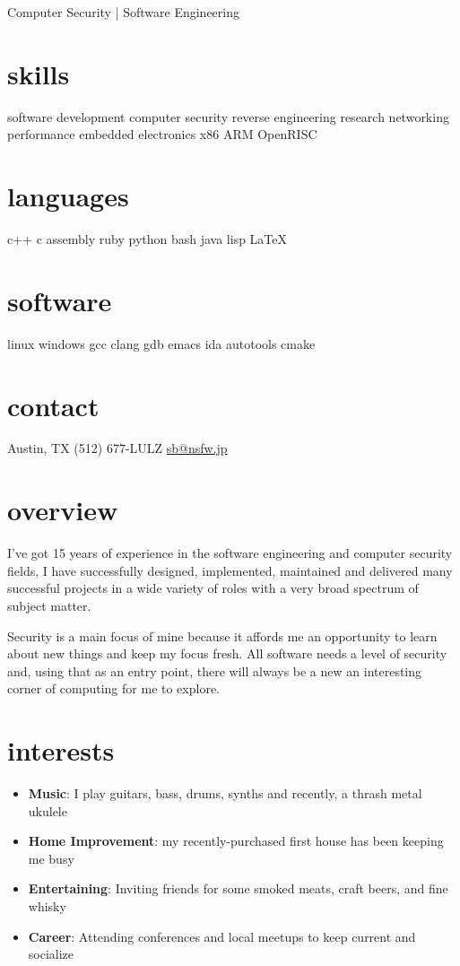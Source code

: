 \documentclass[]{friggeri-cv}
\begin{document}
       {Computer Security | Software Engineering}

\begin{aside}
  \section{skills}
  software development
  computer security
  reverse engineering
  research
  networking
  performance
  embedded
  electronics
  x86
  ARM
  OpenRISC
  \section{languages}
  c++
  c
  assembly
  ruby
  python
  bash
  java
  lisp
  \LaTeX
  \section{software}
  linux
  windows
  gcc
  clang
  gdb
  emacs
  ida
  autotools
  cmake
  \section{contact}
  Austin, TX
  (512) 677-LULZ
  \href{mailto:sb@nsfw.jp}{sb@nsfw.jp}
\end{aside}

\section{overview}

I've got 15 years of experience in the software engineering and
computer security fields, I have successfully designed, implemented,
maintained and delivered many successful projects in a wide variety of
roles with a very broad spectrum of subject matter.

Security is a main focus of mine because it affords me an opportunity
to learn about new things and keep my focus fresh. All software needs
a level of security and, using that as an entry point, there will
always be a new an interesting corner of computing for me to explore.

\section{interests}

\begin{itemize}
\item{\textbf{Music}: I play guitars, bass, drums, synths and recently, a thrash metal ukulele}
\item{\textbf{Home Improvement}: my recently-purchased first house has been keeping me busy}
\item{\textbf{Entertaining}: Inviting friends for some smoked meats, craft
  beers, and fine whisky}
\item{\textbf{Career}: Attending conferences and local meetups to keep current
  and socialize}
\end{itemize}
\end{document}
